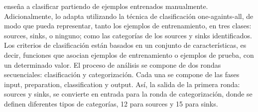 enseña a clasificar partiendo de ejemplos entrenados manualmente.
Adicionalmente, lo adapta utilizando la técnica de clasificación
one-againts-all, de modo que pueda representar, tanto los ejemplos de
entrenamiento, en tres clases: sources, sinks, o ninguno; como las
categorías de los sources y sinks identificados.\newline 
Los criterios de clasificación están basados en un conjunto de características,
es decir, funciones que asocian ejemplos de entrenamiento o ejemplos de prueba,
con un determinado valor.\newline
El proceso de análisis se compone de dos rondas secuenciales: clasificación y
categorización. Cada una se compone de las fases input, preparation,
classification y output. Así, la salida de la primera ronda: sources y sinks, se
convierte en entrada para la ronda de categorización, donde se definen
diferentes tipos de categorías, 12 para sources y 15 para sinks.